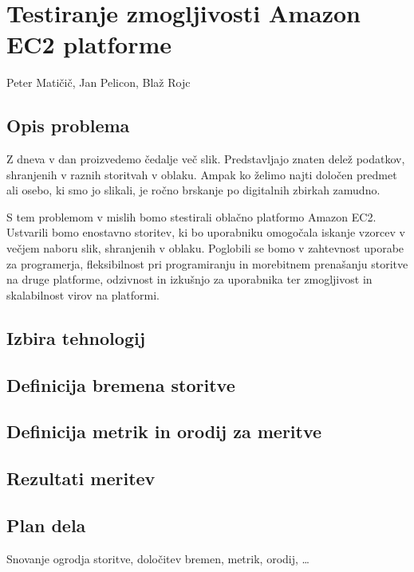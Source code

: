 \chapter[Testiranje zmogljivosti Amazon EC2 platforme (P. Matičič, J. Pelicon, B. Rojc)]{Testiranje zmogljivosti Amazon EC2 platforme}

\pagestyle{fancy}
\fancyhf{}
\fancyhead[LE,RO]{\thepage}
\fancyhead[RE,LO]{\leftmark}

\huge Peter Matičič, Jan Pelicon, Blaž Rojc
\normalsize
\bigskip

\section{Opis problema}

Z dneva v dan proizvedemo čedalje več slik.
Predstavljajo znaten delež podatkov, shranjenih v raznih storitvah v oblaku.
Ampak ko želimo najti določen predmet ali osebo, ki smo jo slikali, je ročno brskanje po digitalnih zbirkah zamudno.

S tem problemom v mislih bomo stestirali oblačno platformo Amazon EC2.
Ustvarili bomo enostavno storitev, ki bo uporabniku omogočala iskanje vzorcev v večjem naboru slik, shranjenih v oblaku.
Poglobili se bomo v zahtevnost uporabe za programerja, fleksibilnost pri programiranju in morebitnem prenašanju storitve na druge platforme,
	odzivnost in izkušnjo za uporabnika ter zmogljivost in skalabilnost virov na platformi.

\section{Izbira tehnologij}

\section{Definicija bremena storitve}

\section{Definicija metrik in orodij za meritve}

\section{Rezultati meritev}

\section{Plan dela}

Snovanje ogrodja storitve, določitev bremen, metrik, orodij, \ldots

